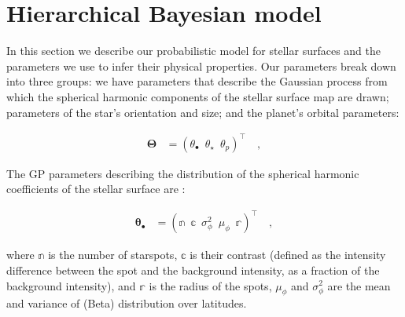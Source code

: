 \documentclass[twocolumn]{aastex631}
\begin{document}
%

\section{Hierarchical Bayesian model}
\label{sec:model}

In this section we describe our probabilistic model for stellar surfaces and the
parameters we use to infer their physical properties.  Our parameters break down
into three groups: we have parameters that describe the \citet{Luger2021b}
Gaussian process from which the spherical harmonic components of the stellar
surface map are drawn; parameters of the star's orientation and size; and the
planet's orbital parameters:
\begin{linenomath}\begin{align}
    \label{eq:largetheta}
    \pmb{\Theta}
     & =
    \left(
    \theta_\bullet
    \,\,\,
    \theta_\star
    \,\,\,
    \theta_p
    \right)^\top
    \quad,
\end{align}\end{linenomath}

The GP parameters describing the distribution of the spherical harmonic
coefficients of the stellar surface are 
\citep{Luger2021b}:
%
\begin{linenomath}\begin{align}
        \label{eq:thetaspot}
        \pmb{\theta}_\bullet
         & =
        \left(
        \mathbb{n}
        \,\,\,
        \mathbb{c}
        \,\,\,
        \sigma^2_\phi
        \,\,\,
        \mu_\phi
        \,\,\,
        \mathbb{r}
        \right)^\top
        \quad,
    \end{align}\end{linenomath}
%
where $\mathbb{n}$ is the number of starspots, $\mathbb{c}$ is their contrast
(defined as the intensity difference between the spot and the background
intensity, as a fraction of the background intensity), and $\mathbb{r}$ is the
radius of the spots, $\mu_\phi$ and $\sigma^2_\phi$ are the mean and variance of
(Beta) distribution over latitudes. 
\end{document}
